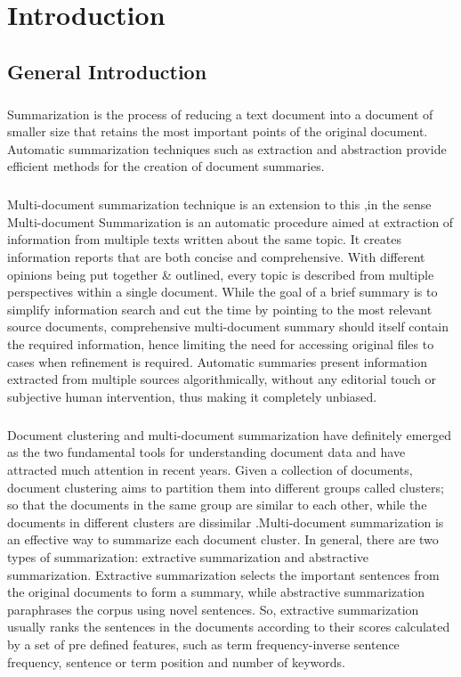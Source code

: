 \chapter{Introduction}

\section{General Introduction}
\paragraph{}Summarization is the process of reducing a text document into a document of smaller size that retains the most important points of the original document. Automatic summarization techniques such as extraction and abstraction provide efficient methods for the creation of document summaries.

\paragraph{}Multi-document summarization technique is an extension to this ,in the sense Multi-document Summarization is an automatic procedure aimed at extraction of information from multiple texts written about the same topic. It creates information reports that are both concise and comprehensive. With different opinions being put together \& outlined, every topic is described from multiple perspectives within a single document. While the goal of a brief summary is to simplify information search and cut the time by pointing to the most relevant source documents, comprehensive multi-document summary should itself contain the required information, hence limiting the need for accessing original files to cases when refinement is required. Automatic summaries present information extracted from multiple sources algorithmically, without any editorial touch or subjective human intervention, thus making it completely unbiased.
 
\paragraph{}Document clustering and multi-document summarization have definitely emerged as the two fundamental tools for understanding document data and have attracted much attention in recent years. Given a collection of documents, document clustering aims to partition them into different groups called clusters; so that the documents in the same group are similar to each other, while the documents in different clusters are dissimilar .Multi-document summarization is an effective way to summarize each document cluster. In general, there are two types of summarization: extractive summarization and abstractive summarization. Extractive summarization selects the important sentences from the original documents to form a summary, while abstractive summarization paraphrases the corpus using novel sentences. So, extractive summarization usually ranks the sentences in the documents according to their scores calculated by a set of pre deﬁned features, such as term frequency-inverse sentence frequency, sentence or term position and number of keywords.

